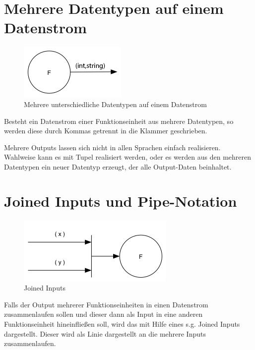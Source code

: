 \section{Mehrere Datentypen auf einem Datenstrom}


\begin{figure}[H]
	\centering
	\includegraphics[width=.5\linewidth]{./img/diagramIntString.png}
	\caption{Mehrere unterschiedliche Datentypen auf einem Datenstrom}
\end{figure}


Besteht ein Datenstrom einer Funktionseinheit aus mehrere Datentypen, so werden diese durch Kommas getrennt in die Klammer geschrieben.

Mehrere Outputs lassen sich nicht in allen Sprachen einfach realisieren.
Wahlweise kann es mit Tupel realisiert werden, oder es werden aus den mehreren Datentypen ein 
neuer Datentyp erzeugt, der alle Output-Daten beinhaltet.

\section{Joined Inputs und Pipe-Notation}

\begin{figure}[H]
	\centering
	\includegraphics[width=.7\linewidth]{./img/diagramJoin.png}
	\caption{Joined Inputs}
\end{figure}


Falls der Output mehrerer Funktionseinheiten in einen Datenstrom zusammenlaufen
sollen und dieser dann als Input in eine anderen Funktionseinheit hineinfließen
soll, wird das mit Hilfe eines s.g. Joined Inputs dargestellt. 
Dieser wird als Linie dargestellt an die mehrere Inputs zusammenlaufen.

